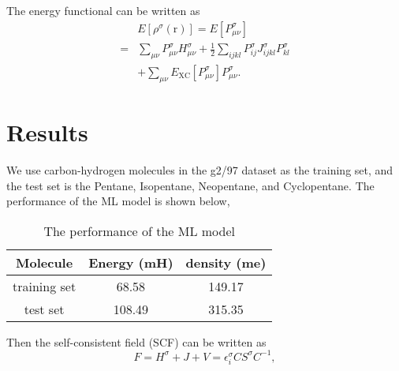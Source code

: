 \documentclass[%
twocolumn,
amsmath,amssymb,
groupedaddress,
reprint,%
]{revtex4-2}
\renewcommand{\>}{\rangle}
\newcommand{\<}{\langle}
\newcommand{\nl}{\nonumber \\}
\newcommand{\XC}{\mathrm{XC}}
\newcommand{\brm}[1]{\bm{\mathrm{#1}}}
\begin{document}
The energy functional can be written as
\begin{align}
      & E[\rho^{{\sigma}}(\brm{r})] = E[P^{\sigma}_{\mu \nu}] \nl
    = & \sum_{\mu \nu} P^{\sigma}_{\mu \nu} H^{\sigma}_{\mu \nu} + \frac{1}{2} \sum_{ijkl} P^{\sigma}_{ij} J^{\sigma}_{ijkl} P^{\sigma}_{kl}  \nl
      & + \sum_{\mu \nu}  E_{\XC}[P^{\sigma}_{\mu \nu}] P^{\sigma}_{\mu \nu}.
\end{align}

\section{Results}
We use carbon-hydrogen molecules in the g2/97 dataset as the training set, and the test set is the Pentane, Isopentane, Neopentane, and Cyclopentane.
%
The performance of the ML model is shown below,
\begin{table}[h]
    \centering
    \begin{tabular}{c|c|c}
        \hline
        Molecule     & Energy (mH) & density (me) \\
        \hline
        training set & 68.58       & 149.17       \\
        test set     & 108.49      & 315.35       \\
        \hline
    \end{tabular}
    \caption{The performance of the ML model}
\end{table}

Then the self-consistent field (SCF) can be written as
\begin{equation}
    F = H^{\sigma} + J + V = \epsilon^{\sigma}_{i} C S^{\sigma} C^{-1},
\end{equation}
\end{document}
